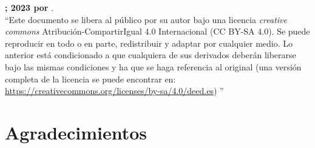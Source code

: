 \vspace{2in}
\noindent \textbf{\ccbysa; 2023 por \minombre}.\\
``Este documento se libera al público por su autor bajo una licencia
{\it creative commons} Atribución-CompartirIgual 4.0 Internacional (CC
BY-SA 4.0). Se puede reproducir en todo o en parte, redistribuir y
adaptar por cualquier medio. Lo anterior está condicionado a que
cualquiera de sus derivados deberán liberarse bajo las mismas
condiciones y ha que se haga referencia al original (una versión
completa de la licencia se puede encontrar en:
\url{https://creativecommons.org/licenses/by-sa/4.0/deed.es}) ''



\chapter*{Agradecimientos}


\tableofcontents
\listoffigures
\clearpage



